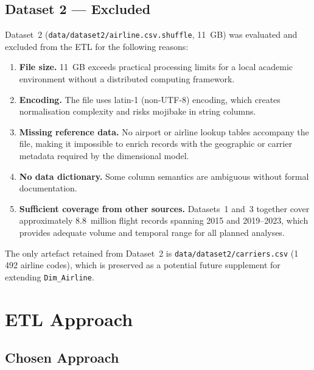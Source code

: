\documentclass[12pt,a4paper]{article}
\begin{document}
\subsection{Dataset 2 — Excluded}

Dataset~2 (\texttt{data/dataset2/airline.csv.shuffle}, 11~GB) was evaluated
and excluded from the ETL for the following reasons:

\begin{enumerate}
    \item \textbf{File size.} 11~GB exceeds practical processing limits for a
    local academic environment without a distributed computing framework.
    \item \textbf{Encoding.} The file uses latin-1 (non-UTF-8) encoding, which
    creates normalisation complexity and risks mojibake in string columns.
    \item \textbf{Missing reference data.} No airport or airline lookup tables
    accompany the file, making it impossible to enrich records with the
    geographic or carrier metadata required by the dimensional model.
    \item \textbf{No data dictionary.} Some column semantics are ambiguous
    without formal documentation.
    \item \textbf{Sufficient coverage from other sources.} Datasets~1 and~3
    together cover approximately 8.8~million flight records spanning 2015
    and 2019–2023, which provides adequate volume and temporal range for all
    planned analyses.
\end{enumerate}

The only artefact retained from Dataset~2 is
\texttt{data/dataset2/carriers.csv} (1\,492 airline codes), which is
preserved as a potential future supplement for extending \texttt{Dim\_Airline}.

\section{ETL Approach}

\subsection{Chosen Approach}
\end{document}
